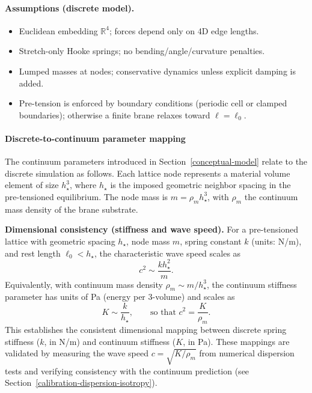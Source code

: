 \paragraph{Assumptions (discrete model).}
\begin{itemize}
\item Euclidean embedding $\mathbb R^4$; forces depend only on 4D edge lengths.
\item Stretch-only Hooke springs; no bending/angle/curvature penalties.
\item Lumped masses at nodes; conservative dynamics unless explicit damping is added.
\item Pre-tension is enforced by boundary conditions (periodic cell or clamped boundaries); otherwise a finite brane relaxes toward $\ell=\ell_0$.
\end{itemize}

\paragraph{Discrete-to-continuum parameter mapping}\label{discrete-continuum-mapping}

The continuum parameters introduced in Section~\ref{conceptual-model} relate to the discrete simulation as follows. Each lattice node represents a material volume element of size $h_\star^3$, where $h_\star$ is the imposed geometric neighbor spacing in the pre-tensioned equilibrium. The node mass is $m = \rho_m h_\star^3$, with $\rho_m$ the continuum mass density of the brane substrate.

\textbf{Dimensional consistency (stiffness and wave speed).}
For a pre-tensioned lattice with geometric spacing $h_\star$, node mass $m$, spring constant $k$ (units: N/m), and rest length $\ell_0<h_\star$, the characteristic wave speed scales as
\begin{equation}
c^2 \sim \frac{k h_\star^2}{m}.
\end{equation}
Equivalently, with continuum mass density $\rho_m \sim m/h_\star^3$, the continuum stiffness parameter has units of Pa (energy per 3-volume) and scales as
\begin{equation}
K \sim \frac{k}{h_\star},
\qquad \text{so that } c^2 = \frac{K}{\rho_m}.
\end{equation}
This establishes the consistent dimensional mapping between discrete spring stiffness ($k$, in N/m) and continuum stiffness ($K$, in Pa). These mappings are validated by measuring the wave speed $c = \sqrt{K/\rho_m}$ from numerical dispersion tests and verifying consistency with the continuum prediction (see Section~\ref{calibration-dispersion-isotropy}).

